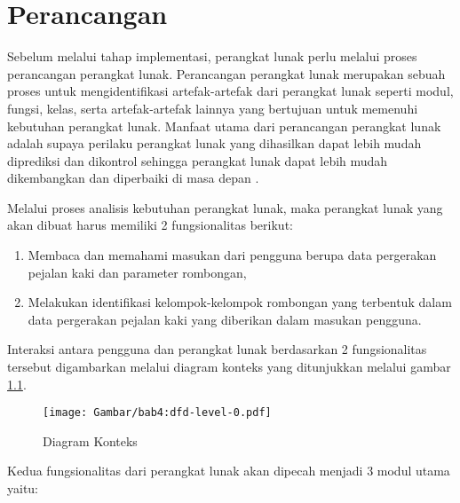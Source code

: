 \chapter{Perancangan}
\label{chap:perancangan}

Sebelum melalui tahap implementasi, perangkat lunak perlu melalui proses perancangan perangkat lunak. Perancangan perangkat lunak merupakan sebuah proses untuk mengidentifikasi artefak-artefak dari perangkat lunak seperti modul, fungsi, kelas, serta artefak-artefak lainnya yang bertujuan untuk memenuhi kebutuhan perangkat lunak. Manfaat utama dari perancangan perangkat lunak adalah supaya perilaku perangkat lunak yang dihasilkan dapat lebih mudah diprediksi dan dikontrol sehingga perangkat lunak dapat lebih mudah dikembangkan dan diperbaiki di masa depan \cite{budgen:04:software-design}.

Melalui proses analisis kebutuhan perangkat lunak, maka perangkat lunak yang akan dibuat harus memiliki 2 fungsionalitas berikut:

\begin{enumerate}
    \item Membaca dan memahami masukan dari pengguna berupa data pergerakan pejalan kaki dan parameter rombongan,
    \item Melakukan identifikasi kelompok-kelompok rombongan yang terbentuk dalam data pergerakan pejalan kaki yang diberikan dalam masukan pengguna.
\end{enumerate}

Interaksi antara pengguna dan perangkat lunak berdasarkan 2 fungsionalitas tersebut digambarkan melalui diagram konteks yang ditunjukkan melalui gambar \ref{bab4:context-diagram}.

\begin{figure}[h]
    \centering
    \texttt{[image: Gambar/bab4:dfd-level-0.pdf]}
    \caption{Diagram Konteks}
    \label{bab4:context-diagram}
\end{figure}

\noindent Kedua fungsionalitas dari perangkat lunak akan dipecah menjadi 3 modul utama yaitu:

